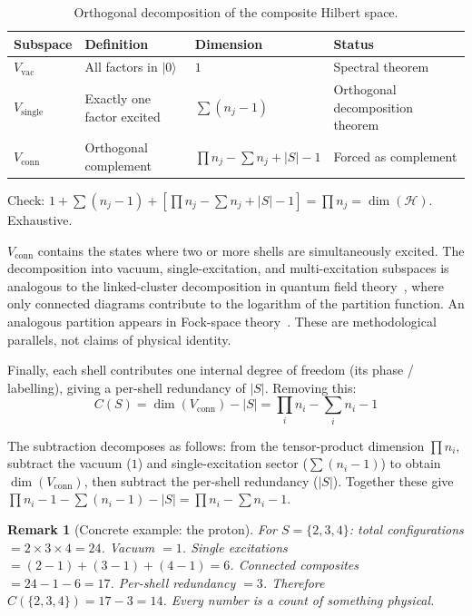\documentclass[12pt]{article}
\newtheorem{remark}[theorem]{Remark}
\begin{document}
\begin{table}[ht]
\centering
\caption{Orthogonal decomposition of the composite Hilbert space.}
\label{tab:statecount}
\begin{tabular}{@{}llll@{}}
\toprule
Subspace & Definition & Dimension & Status \\
\midrule
$V_{\mathrm{vac}}$ & All factors in $|0\rangle$ & $1$ & Spectral theorem \\
$V_{\mathrm{single}}$ & Exactly one factor excited & $\sum(n_j - 1)$ & Orthogonal decomposition theorem \\
$V_{\mathrm{conn}}$ & Orthogonal complement & $\prod n_j - \sum n_j + |S| - 1$ & Forced as complement \\
\bottomrule
\end{tabular}
\end{table}

Check: $1 + \sum(n_j - 1) + [\prod n_j - \sum n_j + |S| - 1] = \prod n_j = \dim(\mathcal{H})$. Exhaustive.

$V_{\mathrm{conn}}$ contains the states where two or more shells are simultaneously excited. The decomposition into vacuum, single-excitation, and multi-excitation subspaces is analogous to the linked-cluster decomposition in quantum field theory~\citep{Weinberg1995}, where only connected diagrams contribute to the logarithm of the partition function. An analogous partition appears in Fock-space theory~\citep{FetterWalecka1971}. These are methodological parallels, not claims of physical identity.

Finally, each shell contributes one internal degree of freedom (its phase / labelling), giving a per-shell redundancy of $|S|$. Removing this:
\begin{equation}\label{eq:invariant}
    C(S) = \dim(V_{\mathrm{conn}}) - |S| = \prod_i n_i - \sum_i n_i - 1
\end{equation}

The subtraction decomposes as follows: from the tensor-product dimension $\prod n_i$, subtract the vacuum ($1$) and single-excitation sector ($\sum(n_i - 1)$) to obtain $\dim(V_{\mathrm{conn}})$, then subtract the per-shell redundancy ($|S|$). Together these give $\prod n_i - 1 - \sum(n_i - 1) - |S| = \prod n_i - \sum n_i - 1$.

\begin{remark}[Concrete example: the proton]
For $S = \{2, 3, 4\}$: total configurations $= 2 \times 3 \times 4 = 24$. Vacuum $= 1$. Single excitations $= (2{-}1) + (3{-}1) + (4{-}1) = 6$. Connected composites $= 24 - 1 - 6 = 17$. Per-shell redundancy $= 3$. Therefore $C(\{2,3,4\}) = 17 - 3 = 14$. Every number is a count of something physical.
\end{remark}
\end{document}
